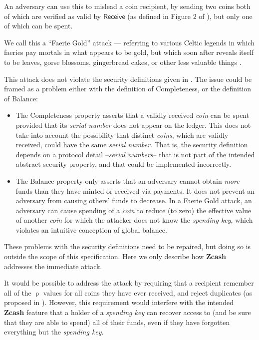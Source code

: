 \documentclass{article}
\newcommand{\term}[1]{\textsl{#1}\xspace}
\newcommand{\termbf}[1]{\textbf{#1}\xspace}
\newcommand{\Zcash}{\termbf{Zcash}}
\newcommand{\coin}{\term{coin}}
\newcommand{\coins}{\term{coins}}
\newcommand{\serialNumber}{\term{serial number}}
\newcommand{\serialNumbers}{\term{serial numbers}}
\newcommand{\spendingKey}{\term{spending key}}
\newcommand{\CoinAddressRand}{\mathsf{\uprho}}
\newcommand{\Receive}{\mathsf{Receive}}
\begin{document}
An adversary can use this to mislead a coin recipient, by sending
two coins both of which are verified as valid by $\Receive$ (as
defined in Figure 2 of \cite{ZerocashOakland}), but only one of
which can be spent.

We call this a ``Faerie Gold'' attack --- referring to various Celtic
legends in which faeries pay mortals in what appears to be gold,
but which soon after reveals itself to be leaves, gorse blossoms,
gingerbread cakes, or other less valuable things \cite{LG2004}.

This attack does not violate the security definitions given in
\cite{ZerocashOakland}. The issue could be framed as a problem
either with the definition of Completeness, or the definition of
Balance:

\begin{itemize}
  \item The Completeness property asserts that a validly received
\coin can be spent provided that its \serialNumber does not appear
on the ledger. This does not take into account the possibility
that distinct \coins, which are validly received, could have the
same \serialNumber. That is, the security definition depends on
a protocol detail --\serialNumbers-- that is not part of the
intended abstract security property, and that could be implemented
incorrectly.
  \item The Balance property only asserts that an adversary cannot
obtain \emph{more} funds than they have minted or received via
payments. It does not prevent an adversary from causing others'
funds to decrease. In a Faerie Gold attack, an adversary can cause
spending of a \coin to reduce (to zero) the effective value of another
\coin for which the attacker does not know the \spendingKey, which
violates an intuitive conception of global balance.
\end{itemize}

These problems with the security definitions need to be repaired,
but doing so is outside the scope of this specification. Here we
only describe how \Zcash addresses the immediate attack.

It would be possible to address the attack by requiring that a
recipient remember all of the $\CoinAddressRand$ values for all
coins they have ever received, and reject duplicates (as proposed
in \cite{GGM2016}). However, this requirement would interfere
with the intended \Zcash feature that a holder of a \spendingKey
can recover access to (and be sure that they are able to spend) all
of their funds, even if they have forgotten everything but the
\spendingKey.
\end{document}
